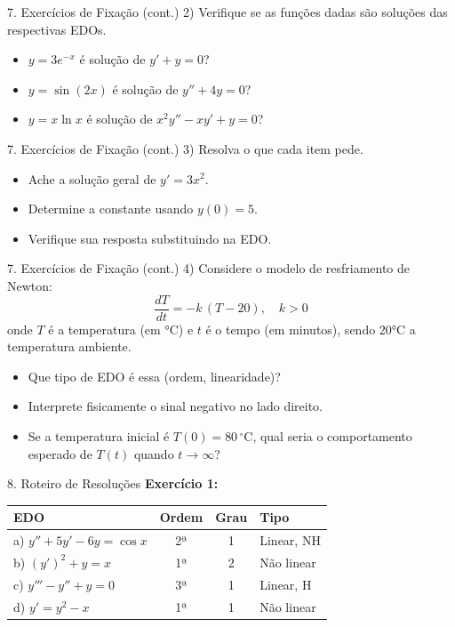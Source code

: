 \documentclass[11pt, aspectratio=169]{beamer}
\begin{document}
\begin{frame}{7. Exercícios de Fixação (cont.)}
2) Verifique se as funções dadas são soluções das respectivas EDOs.
\begin{itemize}
  \item[a)] $y = 3e^{-x}$ é solução de $y' + y = 0$?
  \item[b)] $y = \sin(2x)$ é solução de $y'' + 4y = 0$?
  \item[c)] $y = x\ln x$ é solução de $x^2 y'' - xy' + y = 0$?
\end{itemize}
\end{frame}

\begin{frame}{7. Exercícios de Fixação (cont.)}
3) Resolva o que cada item pede.
\begin{itemize}
  \item[a)] Ache a solução geral de $y' = 3x^2$.
  \item[b)] Determine a constante usando $y(0) = 5$.
  \item[c)] Verifique sua resposta substituindo na EDO.
\end{itemize}
\end{frame}

\begin{frame}{7. Exercícios de Fixação (cont.)}
4) Considere o modelo de resfriamento de Newton:
\[
\frac{dT}{dt} = -k\,(T - 20), \quad k > 0
\]
onde $T$ é a temperatura (em °C) e $t$ é o tempo (em minutos), sendo 20°C a temperatura ambiente.
\begin{itemize}
  \item[a)] Que tipo de EDO é essa (ordem, linearidade)?
  \item[b)] Interprete fisicamente o sinal negativo no lado direito.
  \item[c)] Se a temperatura inicial é $T(0) = 80\,^\circ\text{C}$, qual seria o comportamento esperado de $T(t)$ quando $t \to \infty$?
\end{itemize}
\end{frame}

\begin{frame}{8. Roteiro de Resoluções}
\textbf{Exercício 1:}

\begin{center}
\small
\begin{tabular}{lccl}
\textcolor{accent}{\textbf{EDO}} & \textcolor{accent}{\textbf{Ordem}} & \textcolor{accent}{\textbf{Grau}} & \textcolor{accent}{\textbf{Tipo}} \\
\hline
a) $y'' + 5y' - 6y = \cos x$ & 2ª & 1 & Linear, NH \\
b) $(y')^2 + y = x$ & 1ª & 2 & Não linear \\
c) $y''' - y'' + y = 0$ & 3ª & 1 & Linear, H \\
d) $y' = y^2 - x$ & 1ª & 1 & Não linear \\
\end{tabular}
\end{center}
\end{frame}
\end{document}
